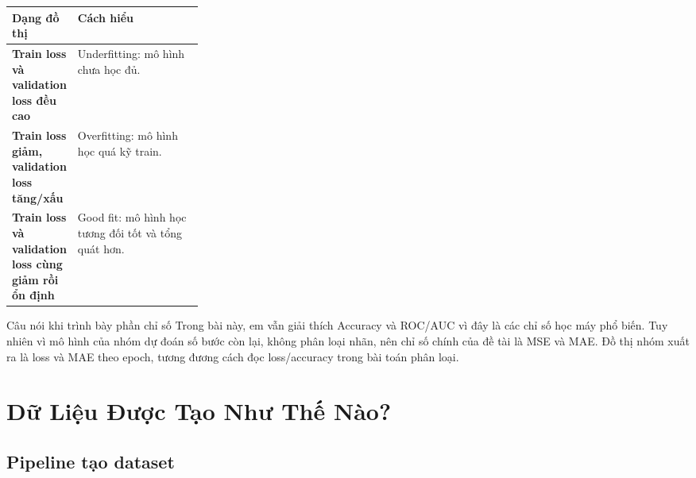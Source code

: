 \documentclass[12pt,a4paper]{article}
\begin{document}
\begin{center}
\end{center}

\begin{center}
\begin{tabularx}{0.95\linewidth}{>{\bfseries}p{0.28\linewidth}X}
\toprule
Dạng đồ thị & Cách hiểu \\
\midrule
Train loss và validation loss đều cao & Underfitting: mô hình chưa học đủ. \\
Train loss giảm, validation loss tăng/xấu & Overfitting: mô hình học quá kỹ train. \\
Train loss và validation loss cùng giảm rồi ổn định & Good fit: mô hình học tương đối tốt và tổng quát hơn. \\
\bottomrule
\end{tabularx}
\end{center}

\begin{saybox}{Câu nói khi trình bày phần chỉ số}
Trong bài này, em vẫn giải thích Accuracy và ROC/AUC vì đây là các chỉ số học máy phổ biến. Tuy nhiên vì mô hình của nhóm dự đoán số bước còn lại, không phân loại nhãn, nên chỉ số chính của đề tài là MSE và MAE. Đồ thị nhóm xuất ra là loss và MAE theo epoch, tương đương cách đọc loss/accuracy trong bài toán phân loại.
\end{saybox}

\section{Dữ Liệu Được Tạo Như Thế Nào?}

\subsection{Pipeline tạo dataset}
\end{document}
